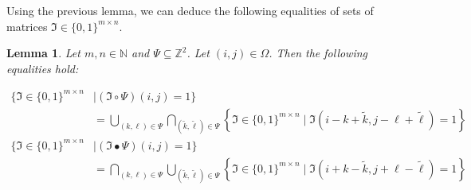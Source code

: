 \documentclass[a4paper,12pt]{article}
\theoremstyle{plain}
\newtheorem{lemma}[theorem]{Lemma}
\theoremstyle{definition}
\numberwithin{equation}{section}
\begin{document}
Using the previous lemma, we can deduce the following equalities of sets of matrices $\mathfrak{I} \in \{ 0, 1 \}^{m \times n}$.

\begin{lemma}\label{lem: openingclosingset}
	Let $m, n \in \mathbb{N}$ and $\Psi \subseteq \mathbb{Z}^2$. Let $(i, j) \in \Omega$. Then the following equalities hold:
	\begin{samepage}
		\begin{equation}
			\begin{aligned}
				\big\{ \mathfrak{I} \in \{ 0, 1 \}^{m \times n} &\mid (\mathfrak{I} \circ \Psi)(i, j) = 1 \big\} \\
				&= \bigcup_{(k, \ell) \in \Psi} \bigcap_{(\tilde{k}, \tilde{\ell}) \in \Psi} \left\{ \mathfrak{I} \in \{ 0, 1 \}^{m \times n} \mid \mathfrak{I}(i - k + \tilde{k}, j - \ell + \tilde{\ell}) = 1 \right\} \label{eq: openingset}
			\end{aligned}
		\end{equation}
		\begin{equation}
			\begin{aligned}
				\big\{ \mathfrak{I} \in \{ 0, 1 \}^{m \times n} &\mid (\mathfrak{I} \bullet \Psi)(i, j) = 1 \big\} \\
				&= \bigcap_{(k, \ell) \in \Psi} \bigcup_{(\tilde{k}, \tilde{\ell}) \in \Psi} \left\{ \mathfrak{I} \in \{ 0, 1 \}^{m \times n} \mid \mathfrak{I}(i + k - \tilde{k}, j + \ell - \tilde{\ell}) = 1 \right\} \label{eq: closingset}
			\end{aligned}
		\end{equation}
	\end{samepage}
\end{lemma}
\end{document}
